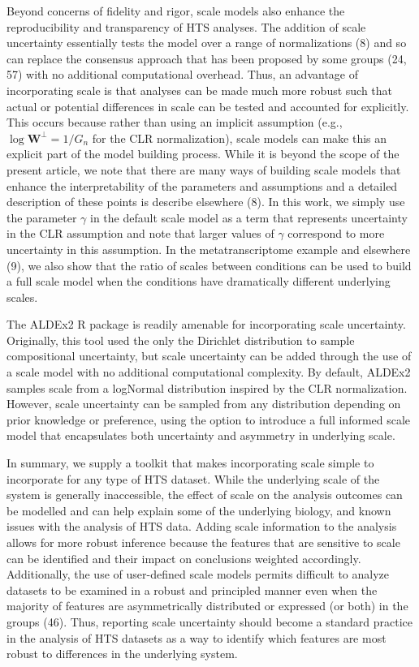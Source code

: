 \documentclass[
]{article}
\begin{document}
Beyond concerns of fidelity and rigor, scale models also enhance the
reproducibility and transparency of HTS analyses. The addition of scale
uncertainty essentially tests the model over a range of normalizations
(8) and so can replace the consensus approach that has been proposed by
some groups (24, 57) with no additional computational overhead. Thus, an
advantage of incorporating scale is that analyses can be made much more
robust such that actual or potential differences in scale can be tested
and accounted for explicitly. This occurs because rather than using an
implicit assumption (e.g., \(\log \mathbf{W}^{\perp}=1/G_{n}\) for the
CLR normalization), scale models can make this an explicit part of the
model building process. While it is beyond the scope of the present
article, we note that there are many ways of building scale models that
enhance the interpretability of the parameters and assumptions and a
detailed description of these points is describe elsewhere (8). In this
work, we simply use the parameter \(\gamma\) in the default scale model
as a term that represents uncertainty in the CLR assumption and note
that larger values of \(\gamma\) correspond to more uncertainty in this
assumption. In the metatranscriptome example and elsewhere (9), we also
show that the ratio of scales between conditions can be used to build a
full scale model when the conditions have dramatically different
underlying scales.

The ALDEx2 R package is readily amenable for incorporating scale
uncertainty. Originally, this tool used the only the Dirichlet
distribution to sample compositional uncertainty, but scale uncertainty
can be added through the use of a scale model with no additional
computational complexity. By default, ALDEx2 samples scale from a
logNormal distribution inspired by the CLR normalization. However, scale
uncertainty can be sampled from any distribution depending on prior
knowledge or preference, using the option to introduce a full informed
scale model that encapsulates both uncertainty and asymmetry in
underlying scale.

In summary, we supply a toolkit that makes incorporating scale simple to
incorporate for any type of HTS dataset. While the underlying scale of
the system is generally inaccessible, the effect of scale on the
analysis outcomes can be modelled and can help explain some of the
underlying biology, and known issues with the analysis of HTS data.
Adding scale information to the analysis allows for more robust
inference because the features that are sensitive to scale can be
identified and their impact on conclusions weighted accordingly.
Additionally, the use of user-defined scale models permits difficult to
analyze datasets to be examined in a robust and principled manner even
when the majority of features are asymmetrically distributed or
expressed (or both) in the groups (46). Thus, reporting scale
uncertainty should become a standard practice in the analysis of HTS
datasets as a way to identify which features are most robust to
differences in the underlying system.
\end{document}
